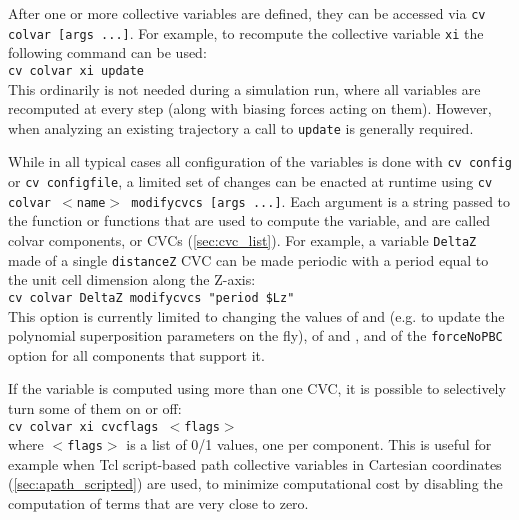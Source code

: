 {

After one or more collective variables are defined, they can be accessed via \texttt{cv colvar [args ...]}.
For example, to recompute the collective variable \texttt{xi} the following command can be used:\\
\noindent\texttt{cv colvar xi update}\\
\noindent{}This ordinarily is not needed during a simulation run, where all variables are recomputed at every step (along with biasing forces acting on them).
However, when analyzing an existing trajectory a call to \texttt{update} is generally required.

While in all typical cases all configuration of the variables is done with \texttt{cv config} or \texttt{cv configfile}, a limited set of changes can be enacted at runtime using \texttt{cv colvar $<$name$>$ modifycvcs [args ...]}.
Each argument is a string passed to the function or functions that are used to compute the variable, and are called colvar components, or CVCs (\ref{sec:cvc_list}).
For example, a variable \texttt{DeltaZ} made of a single \texttt{distanceZ} CVC can be made periodic with a period equal to the unit cell dimension along the Z-axis:\\
\noindent\texttt{cv colvar DeltaZ modifycvcs "period \$Lz"}\\
\noindent{}This option is currently limited to changing the values of  and  (e.g.{} to update the polynomial superposition parameters on the fly), of  and , and of the \texttt{forceNoPBC} option for all components that support it.

If the variable is computed using more than one CVC, it is possible to selectively turn some of them on or off:\\
\noindent\texttt{cv colvar xi cvcflags $<$flags$>$}\\
\noindent{}where \texttt{$<$flags$>$} is a list of 0/1 values, one per component.
This is useful for example when Tcl script-based path collective variables in Cartesian coordinates (\ref{sec:apath_scripted}) are used, to minimize computational cost by disabling the computation of terms that are very close to zero.

}

